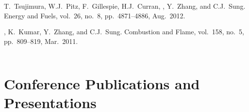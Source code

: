 \begin{bibmune}
\item T.\ Tsujimura, W.J.\ Pitz, F.\ Gillespie, H.J.\ Curran,
        , Y.\ Zhang, and C.J.\ Sung.
         Energy and Fuels, vol.\ 26, no.\ 8, pp.\ 4871--4886,
        Aug.\ 2012.\\

\item {}, K.\ Kumar, Y.\ Zhang, and C.J.\ Sung.
         Combustion and Flame,
        vol.\ 158, no.\ 5, pp.\ 809--819, Mar.\ 2011.\\
        \\
\end{bibmune}

\section{{\sectionfont Conference Publications and Presentations}}


